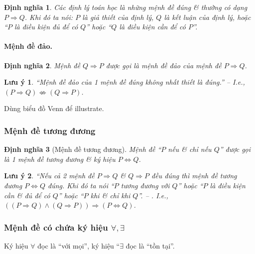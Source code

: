 \documentclass{article}
\numberwithin{equation}{section}
\newtheorem{definition}{Định nghĩa}[section]
\newtheorem{remark}{Lưu ý}[section]
\begin{document}
\begin{definition}
	Các định lý toán học là những mệnh đề đúng \& thường có dạng $P\Rightarrow Q$. Khi đó ta nói: $P$ là \emph{giả thiết} của định lý, $Q$ là \emph{kết luận} của định lý, hoặc ``$P$ là \emph{điều kiện đủ} để có $Q$'' hoặc ``$Q$ là \emph{điều kiện cần} để có $P$''.
\end{definition}

\paragraph{Mệnh đề đảo.}
\begin{definition}
	Mệnh đề $Q\Rightarrow P$ được gọi là \emph{mệnh đề đảo} của mệnh đề $P\Rightarrow Q$.
\end{definition}

\begin{remark}
	``Mệnh đề đảo của 1 mệnh đề đúng không nhất thiết là đúng.'' -- \cite[p. 9]{Khoai_Anh_Tan_Thang_Anh_Cuong_Duong_Dang_Ha_Hanh_Hong_Son_Tuan_Vuong_Toan_10_tap_1} I.e., $(P\Rightarrow Q)\not\Leftrightarrow(Q\Rightarrow P)$.
\end{remark}
Dùng biểu đồ Venn để illustrate.

\subsubsection{Mệnh đề tương đương}

\begin{definition}[Mệnh đề tương đương]
	Mệnh đề ``$P$ nếu \& chỉ nếu $Q$'' được gọi là 1 \emph{mệnh đề tương đương} \& ký hiệu $P\Leftrightarrow Q$.
\end{definition}

\begin{remark}
	``Nếu cả 2 mệnh đề $P\Rightarrow Q$ \& $Q\Rightarrow P$ đều đúng thì mệnh đề tương đương $P\Leftrightarrow Q$ đúng. Khi đó ta nói ``$P$ \emph{tương đương} với $Q$'' hoặc ``$P$ là \emph{điều kiện cần \& đủ} để có $Q$'' hoặc ``$P$ khi \& chỉ khi $Q$''. -- \cite[p. 9]{Khoai_Anh_Tan_Thang_Anh_Cuong_Duong_Dang_Ha_Hanh_Hong_Son_Tuan_Vuong_Toan_10_tap_1}. I.e., $((P\Rightarrow Q)\land(Q\Rightarrow P))\Rightarrow(P\Leftrightarrow Q)$.
\end{remark}

\subsubsection{Mệnh đề có chứa ký hiệu $\forall,\exists$}
Ký hiệu $\forall$ đọc là ``với mọi'', ký hiệu ``$\exists$ đọc là ``tồn tại''.
\end{document}
